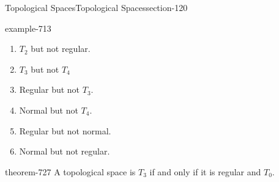 \documentclass[oneside,10pt,]{article}
\begin{document}
\begin{sectionptx}{Topological Spaces}{}{Topological Spaces}{}{}{section-120}
\begin{example}{}{example-713}
\begin{enumerate}
\item\hypertarget{li-716}{}\(T_2\) but not regular.%
\item\hypertarget{li-718}{}\(T_3\) but not \(T_4\)%
\item\hypertarget{li-721}{}Regular but not \(T_3\).%
\item\hypertarget{li-723}{}Normal but not \(T_4\).%
\item\hypertarget{li-725}{}Regular but not normal.%
\item\hypertarget{li-726}{}Normal but not regular.%
\end{enumerate}
\end{example}
\begin{theorem}{}{}{theorem-727}%
\hypertarget{p-728}{}%
A topological space is \(T_3\) if and only if it is regular and \(T_0\).%
\end{theorem}
\end{sectionptx}
%
%
\typeout{************************************************}
\typeout{************************************************}
%
\end{document}
